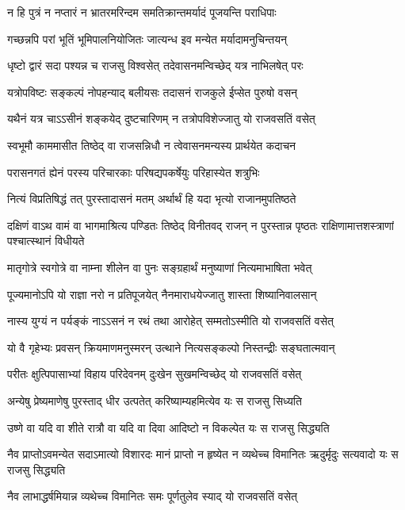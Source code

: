 \twolineshloka
{न हि पुत्रं न नप्तारं न भ्रातरमरिन्दम}
{समतिक्रान्तमर्यादं पूजयन्ति पराधिपाः}


\twolineshloka
{गच्छन्नपि परां भूतिं भूमिपालनियोजितः}
{जात्यन्ध इव मन्येत मर्यादामनुचिन्तयन्}


\twolineshloka
{धृष्टो द्वारं सदा पश्यन्न च राजसु विश्वसेत्}
{तदेवासनमन्विच्छेद् यत्र नाभिलषेत् परः}


\twolineshloka
{यत्रोपविष्टः सङ्कल्पं नोपहन्याद् बलीयसः}
{तदासनं राजकुले ईप्सेत पुरुषो वसन्}


\twolineshloka
{यथैनं यत्र चाऽऽसीनं शङ्कयेद् दुष्टचारिणम्}
{न तत्रोपविशेज्जातु यो राजवसतिं वसेत्}


\twolineshloka
{स्वभूमौ काममासीत तिष्ठेद् वा राजसन्निधौ}
{न त्वेवासनमन्यस्य प्रार्थयेत कदाचन}


\twolineshloka
{परासनगतं ह्येनं परस्य परिचारकाः}
{परिषद्यपकर्षेयुः परिहास्येत शत्रुभिः}


\twolineshloka
{नित्यं विप्रतिषिद्धं तत् पुरस्तादासनं मतम्}
{अर्थार्थं हि यदा भृत्यो राजानमुपतिष्ठते}


\threelineshloka
{दक्षिणं वाऽथ वामं वा भागमाश्रित्य पण्डितः}
{तिष्ठेद् विनीतवद् राजन् न पुरस्तान्न पृष्ठतः}
{राक्षिणामात्तशस्त्राणां पश्चात्स्थानं विधीयते}


\twolineshloka
{मातृगोत्रे स्वगोत्रे वा नाम्ना शीलेन वा पुनः}
{सङ्ग्रहार्थं मनुष्याणां नित्यमाभाषिता भवेत्}


\twolineshloka
{पूज्यमानोऽपि यो राज्ञा नरो न प्रतिपूजयेत्}
{नैनमाराधयेज्जातु शास्ता शिष्यानिवालसान्}


\twolineshloka
{नास्य युग्यं न पर्यङ्कं नाऽऽसनं न रथं तथा}
{आरोहेत् सम्मतोऽस्मीति यो राजवसतिं वसेत्}


\twolineshloka
{यो वै गृहेभ्यः प्रवसन् क्रियमाणमनुस्मरन्}
{उत्थाने नित्यसङ्कल्पो निस्तन्द्रीः सङ्घतात्मवान्}


\twolineshloka
{परीतः क्षुत्पिपासाभ्यां विहाय परिदेवनम्}
{दुःखेन सुखमन्विच्छेद् यो राजवसतिं वसेत्}


\twolineshloka
{अन्येषु प्रेष्यमाणेषु पुरस्ताद् धीर उत्पतेत्}
{करिष्याम्यहमित्येव यः स राजसु सिध्यति}


\twolineshloka
{उष्णे वा यदि वा शीते रात्रौ वा यदि वा दिवा}
{आदिष्टो न विकल्पेत यः स राजसु सिद्ध्यति}


\threelineshloka
{नैव प्राप्तोऽवमन्येत सदाऽमात्यो विशारदः}
{मानं प्राप्तो न हृष्येत न व्यथेच्च विमानितः}
{ऋदुर्मृदुः सत्यवादो यः स राजसु सिद्ध्यति}


\twolineshloka
{नैव लाभाद्धर्षमियान्न व्यथेच्च विमानितः}
{समः पूर्णतुलेव स्याद् यो राजवसतिं वसेत्}


